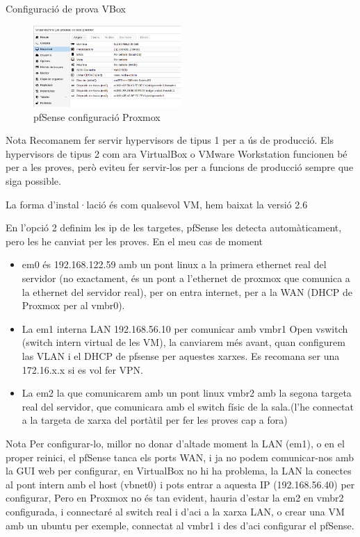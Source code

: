 \documentclass[
  10pt,
]{krantz}
\providecommand{\tightlist}{%
  \setlength{\itemsep}{0pt}\setlength{\parskip}{0pt}}
\begin{document}
Configuració de prova VBox

\begin{figure}
\centering
\includegraphics[width=0.5\textwidth,height=\textheight]{imatges/proxmox/pfSense_conf.png}
\caption{pfSense configuració Proxmox}
\end{figure}

\begin{rmdnote}{Nota}
Recomanem fer servir hypervisors de tipus 1 per a ús de producció. Els hypervisors de tipus 2 com ara VirtualBox o VMware Workstation funcionen bé per a les proves, però eviteu fer servir-los per a funcions de producció sempre que siga possible.

\end{rmdnote}

La forma d'instal·lació és com qualsevol VM, hem baixat la versió 2.6

En l'opció 2 definim les ip de les targetes, pfSense les detecta automàticament, pero les he canviat per les proves. En el meu cas de moment

\begin{itemize}
\tightlist
\item
  em0 és 192.168.122.59 amb un pont linux a la primera ethernet real del servidor (no exactament, és un pont a l'ethernet de proxmox que comunica a la ethernet del servidor real), per on entra internet, per a la WAN (DHCP de Proxmox per al vmbr0).
\item
  La em1 interna LAN 192.168.56.10 per comunicar amb vmbr1 Open vswitch (switch intern virtual de les VM), la canviarem més avant, quan configurem las VLAN i el DHCP de pfsense per aquestes xarxes. Es recomana ser una 172.16.x.x si es vol fer VPN.
\item
  La em2 la que comunicarem amb un pont linux vmbr2 amb la segona targeta real del servidor, que comunicara amb el switch físic de la sala.(l'he connectat a la targeta de xarxa del portàtil per fer les proves cap a fora)
\end{itemize}

\begin{rmdnote}{Nota}
Per configurar-lo, millor no donar d'altade moment la LAN (em1), o en el proper reinici, el pfSense tanca els ports WAN, i ja no podem comunicar-nos amb la GUI web per configurar, en VirtualBox no hi ha problema, la LAN la conectes al pont intern amb el host (vbnet0) i pots entrar a aquesta IP (192.168.56.40) per configurar, Pero en Proxmox no és tan evident, hauria d'estar la em2 en vmbr2 configurada, i connectaré al switch real i d'aci a la xarxa LAN, o crear una VM amb un ubuntu per exemple, connectat al vmbr1 i des d'aci configurar el pfSense.

\end{rmdnote}
\end{document}
